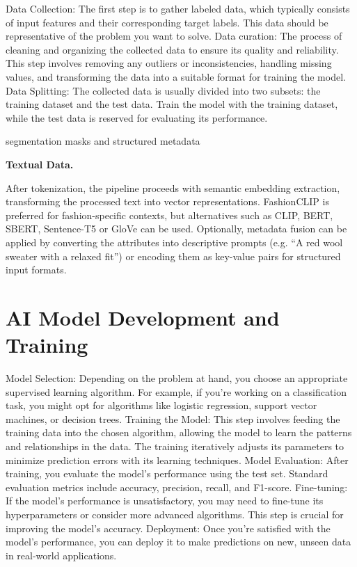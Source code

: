 Data Collection: The first step is to gather labeled data, which typically consists of input features and their corresponding target labels. This data should be representative of the problem you want to solve.
Data curation: The process of cleaning and organizing the collected data to ensure its quality and reliability. This step involves removing any outliers or inconsistencies, handling missing values, and transforming the data into a suitable format for training the model.
Data Splitting: The collected data is usually divided into two subsets: the training dataset and the test data. Train the model with the training dataset, while the test data is reserved for evaluating its performance.

segmentation masks and structured metadata

\textbf{Textual Data.}

After tokenization, the pipeline proceeds with semantic embedding extraction, transforming the processed text into vector representations. Fashion\acs{CLIP} is preferred for fashion-specific contexts, but alternatives such as \acs{CLIP}, BERT, SBERT, Sentence-T5 or \acs{GloVe} can be used. Optionally, metadata fusion can be applied by converting the attributes into descriptive prompts (e.g. “A red wool sweater with a relaxed fit”) or encoding them as key-value pairs for structured input formats.

\section{AI Model Development and Training}

Model Selection: Depending on the problem at hand, you choose an appropriate supervised learning algorithm. For example, if you're working on a classification task, you might opt for algorithms like logistic regression, support vector machines, or decision trees.
Training the Model: This step involves feeding the training data into the chosen algorithm, allowing the model to learn the patterns and relationships in the data. The training iteratively adjusts its parameters to minimize prediction errors with its learning techniques.
Model Evaluation: After training, you evaluate the model's performance using the test set. Standard evaluation metrics include accuracy, precision, recall, and F1-score.
Fine-tuning: If the model's performance is unsatisfactory, you may need to fine-tune its hyperparameters or consider more advanced algorithms. This step is crucial for improving the model's accuracy.
Deployment: Once you're satisfied with the model's performance, you can deploy it to make predictions on new, unseen data in real-world applications.

